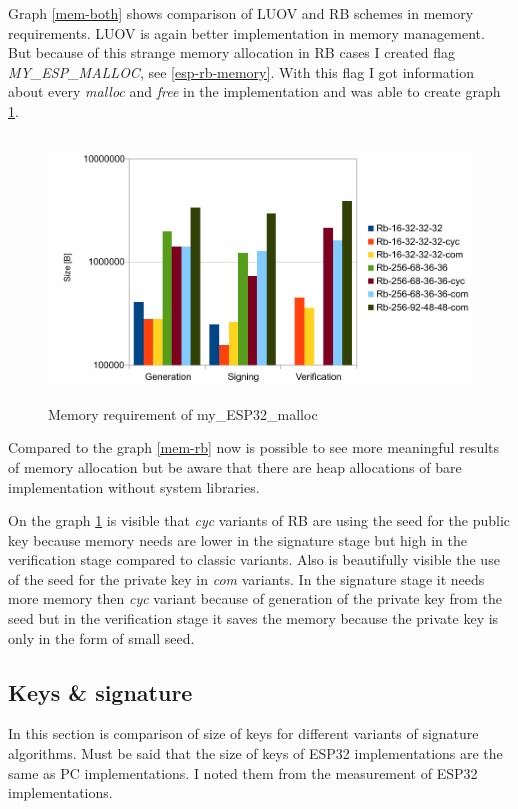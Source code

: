\documentclass[thesis=M,english]{FITthesis}[2019/12/23]
\begin{document}
\noindent
Graph \ref{mem-both} shows comparison of LUOV and RB schemes in memory requirements. LUOV is again better implementation in memory management. But because of this strange memory allocation in RB cases I created flag \textit{MY\_ESP\_MALLOC}, see \ref{esp-rb-memory}. With this flag I got information about every \textit{malloc} and \textit{free} in the implementation and was able to create graph \ref{mem-my-alloc}.

\begin{figure}[H]
\centering
\includegraphics[width=13cm,height=7cm]{images/mem-my_esp_malloc.pdf}
\caption{Memory requirement of my\_ESP32\_malloc}
\label{mem-my-alloc}
\end{figure}

\noindent
Compared to the graph \ref{mem-rb} now is possible to see more meaningful results of memory allocation but be aware that there are heap allocations of bare implementation without system libraries.

\bigskip
\noindent
On the graph \ref{mem-my-alloc} is visible that \textit{cyc} variants of RB are using the seed for the public key because memory needs are lower in the signature stage but high in the verification stage compared to classic variants. Also is beautifully visible the use of the seed for the private key in \textit{com} variants. In the signature stage it needs more memory then \textit{cyc} variant because of generation of the private key from the seed but in the verification stage it saves the memory because the private key is only in the form of small seed.

\subsection{Keys \& signature} \label{key_sign}
In this section is comparison of size of keys for different variants of signature algorithms. Must be said that the size of keys of ESP32 implementations are the same as PC implementations. I noted them from the measurement of ESP32 implementations.
\end{document}
